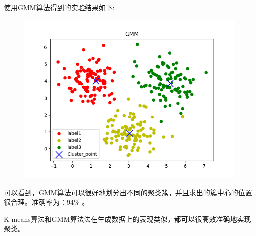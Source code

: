 \documentclass[lang=cn,a4paper,cite=authoryear]{elegantpaper}
\begin{document}
\subsection*{}
使用GMM算法得到的实验结果如下:
\begin{center}
	\begin{figure}[H]
		\centering
		\includegraphics[scale=0.6]{figure_2}
	\end{figure}
\end{center}
可以看到，GMM算法可以很好地划分出不同的聚类簇，并且求出的簇中心的位置很合理。准确率为：94\% 。
\par
K-means算法和GMM算法法在生成数据上的表现类似，都可以很高效准确地实现聚类。
\end{document}
